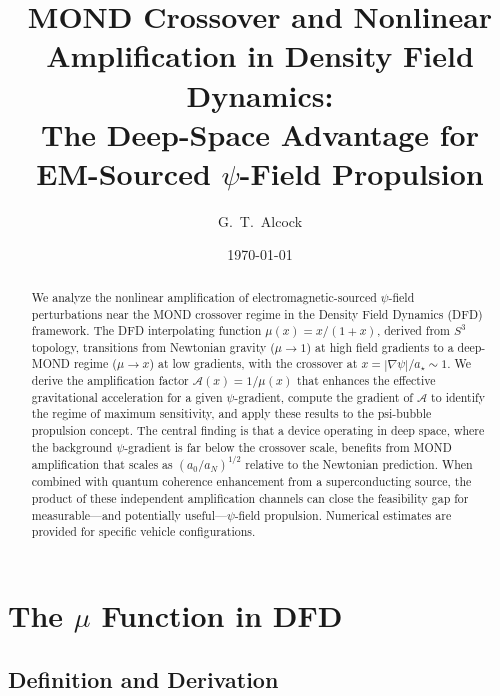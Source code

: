\documentclass[aps,prd,twocolumn,superscriptaddress,nofootinbib]{revtex4-2}
\newcommand{\astar}{a_\star}
\begin{document}
\title{MOND Crossover and Nonlinear Amplification in Density Field Dynamics:\\
The Deep-Space Advantage for EM-Sourced $\psi$-Field Propulsion}

\author{G.~T.~Alcock}

\date{\today}

\begin{abstract}
We analyze the nonlinear amplification of electromagnetic-sourced
$\psi$-field perturbations near the MOND crossover regime in the
Density Field Dynamics (DFD) framework.  The DFD interpolating function
$\mu(x) = x/(1+x)$, derived from $S^3$ topology, transitions from
Newtonian gravity ($\mu \to 1$) at high field gradients to a
deep-MOND regime ($\mu \to x$) at low gradients, with the crossover
at $x = |\nabla\psi|/\astar \sim 1$.  We derive the amplification
factor $\mathcal{A}(x) = 1/\mu(x)$ that enhances the effective
gravitational acceleration for a given $\psi$-gradient, compute the
gradient of $\mathcal{A}$ to identify the regime of maximum
sensitivity, and apply these results to the psi-bubble propulsion
concept.  The central finding is that a device operating in deep space,
where the background $\psi$-gradient is far below the crossover scale,
benefits from MOND amplification that scales as $(a_0/a_N)^{1/2}$
relative to the Newtonian prediction.  When combined with quantum
coherence enhancement from a superconducting source, the product
of these independent amplification channels can close the feasibility
gap for measurable---and potentially useful---$\psi$-field propulsion.
Numerical estimates are provided for specific vehicle configurations.
\end{abstract}

\maketitle

\section{The $\mu$ Function in DFD}\label{sec:mu-function}

\subsection{Definition and Derivation}
\end{document}
